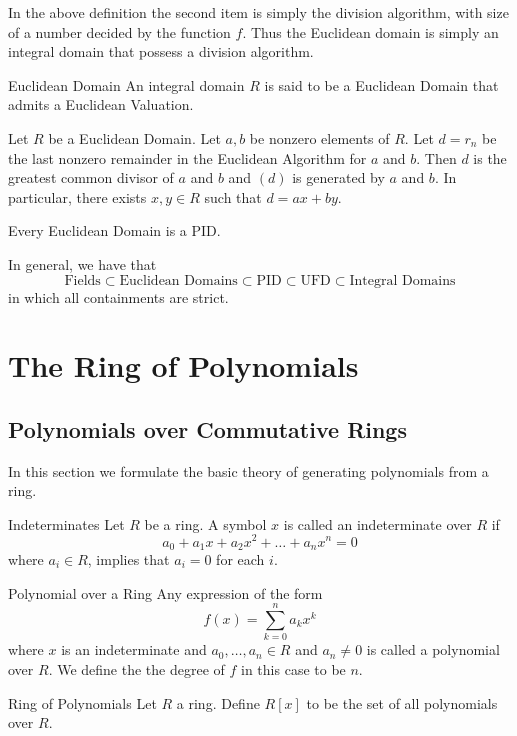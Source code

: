 \documentclass[a4paper]{article}
\begin{document}
In the above definition the second item is simply the division algorithm, with size of a number decided by the function $f$. Thus the Euclidean domain is simply an integral domain that possess a division algorithm. 

\begin{defn}{Euclidean Domain}{} An integral domain $R$ is said to be a Euclidean Domain that admits a Euclidean Valuation. 
\end{defn}

\begin{thm}{}{} Let $R$ be a Euclidean Domain. Let $a,b$ be nonzero elements of $R$. Let $d=r_n$ be the last nonzero remainder in the Euclidean Algorithm for $a$ and $b$. Then $d$ is the greatest common divisor of $a$ and $b$ and $(d)$ is generated by $a$ and $b$. In particular, there exists $x,y\in R$ such that $d=ax+by$. 
\end{thm}

\begin{prp}{}{} Every Euclidean Domain is a PID. 
\end{prp}

In general, we have that $$\text{Fields}\subset\text{Euclidean Domains}\subset\text{PID}\subset\text{UFD}\subset\text{Integral Domains}$$ in which all containments are strict. 

\pagebreak
\section{The Ring of Polynomials}
\subsection{Polynomials over Commutative Rings}
In this section we formulate the basic theory of generating polynomials from a ring. 
\begin{defn}{Indeterminates}{} Let $R$ be a ring. A symbol $x$ is called an indeterminate over $R$ if $$a_0+a_1x+a_2x^2+\dots+a_nx^n=0$$ where $a_i\in R$, implies that $a_i=0$ for each $i$. 
\end{defn}

\begin{defn}{Polynomial over a Ring}{} Any expression of the form $$f(x)=\sum_{k=0}^na_kx^k$$ where $x$ is an indeterminate and $a_0,\dots,a_n\in R$ and $a_n\neq 0$ is called a polynomial over $R$. We define the the degree of $f$ in this case to be $n$. 
\end{defn}

\begin{defn}{Ring of Polynomials}{} Let $R$ a ring. Define $R[x]$ to be the set of all polynomials over $R$. 
\end{defn}
\end{document}
